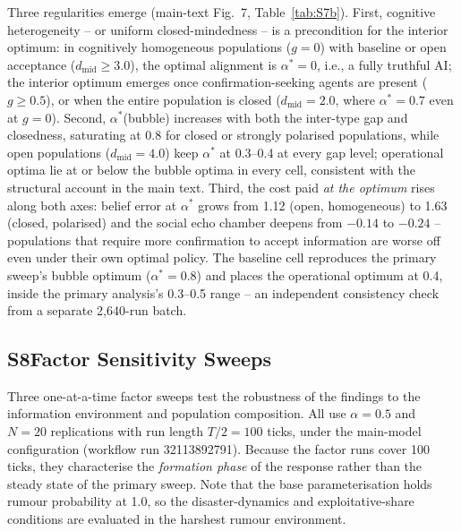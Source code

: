 Three regularities emerge (main-text Fig.~7, Table~\ref{tab:S7b}). First,
cognitive heterogeneity -- or uniform closed-mindedness -- is a precondition
for the interior optimum: in cognitively homogeneous populations ($g = 0$)
with baseline or open acceptance ($d_{\mathrm{mid}} \geq 3.0$), the optimal
alignment is $\alpha^{*} = 0$, i.e., a fully truthful AI; the interior optimum
emerges once confirmation-seeking agents are present ($g \geq 0.5$), or when
the entire population is closed ($d_{\mathrm{mid}} = 2.0$, where
$\alpha^{*} = 0.7$ even at $g = 0$). Second, $\alpha^{*}$(bubble) increases
with both the inter-type gap and closedness, saturating at 0.8 for closed or
strongly polarised populations, while open populations
($d_{\mathrm{mid}} = 4.0$) keep $\alpha^{*}$ at 0.3--0.4 at every gap level;
operational optima lie at or below the bubble optima in every cell, consistent
with the structural account in the main text. Third, the cost paid \emph{at
the optimum} rises along both axes: belief error at $\alpha^{*}$ grows from
1.12 (open, homogeneous) to 1.63 (closed, polarised) and the social echo
chamber deepens from $-0.14$ to $-0.24$ -- populations that require more
confirmation to accept information are worse off even under their own optimal
policy. The baseline cell reproduces the primary sweep's bubble optimum
($\alpha^{*} = 0.8$) and places the operational optimum at 0.4, inside the
primary analysis's 0.3--0.5 range -- an independent consistency check from a
separate 2{,}640-run batch.

\subsection*{S8\quad Factor Sensitivity Sweeps}

Three one-at-a-time factor sweeps test the robustness of the findings to the
information environment and population composition. All use $\alpha = 0.5$ and
$N = 20$ replications with run length $T/2 = 100$ ticks, under the main-model
configuration (workflow run 32113892791). Because the factor runs cover 100
ticks, they characterise the \emph{formation phase} of the response rather
than the steady state of the primary sweep. Note that the base parameterisation
holds rumour probability at 1.0, so the disaster-dynamics and
exploitative-share conditions are evaluated in the harshest rumour
environment.

